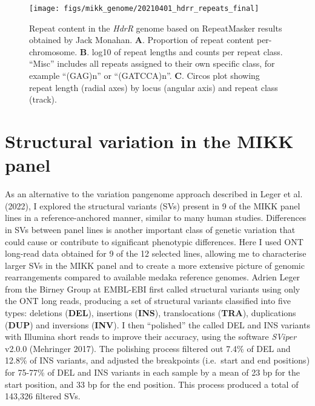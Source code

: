 \documentclass[
]{book}
\begin{document}
\begin{figure}
\texttt{[image: figs/mikk\_genome/20210401\_hdrr\_repeats\_final]} \caption{Repeat content in the \emph{HdrR} genome based on RepeatMasker results obtained by Jack Monahan. \textbf{A}. Proportion of repeat content per-chromosome. \textbf{B}. log10 of repeat lengths and counts per repeat class. ``Misc'' includes all repeats assigned to their own specific class, for example ``(GAG)n'' or ``(GATCCA)n''. \textbf{C}. Circos plot showing repeat length (radial axes) by locus (angular axis) and repeat class (track).}\label{fig:repeats}
\end{figure}

\hypertarget{mikksv-sec}{%
\section{Structural variation in the MIKK panel}\label{mikksv-sec}}

As an alternative to the variation pangenome approach described in Leger et al. (2022), I explored the structural variants (SVs) present in 9 of the MIKK panel lines in a reference-anchored manner, similar to many human studies. Differences in SVs between panel lines is another important class of genetic variation that could cause or contribute to significant phenotypic differences. Here I used ONT long-read data obtained for 9 of the 12 selected lines, allowing me to characterise larger SVs in the MIKK panel and to create a more extensive picture of genomic rearrangements compared to available medaka reference genomes. Adrien Leger from the Birney Group at EMBL-EBI first called structural variants using only the ONT long reads, producing a set of structural variants classified into five types: deletions (\textbf{DEL}), insertions (\textbf{INS}), translocations (\textbf{TRA}), duplications (\textbf{DUP}) and inversions (\textbf{INV}). I then ``polished'' the called DEL and INS variants with Illumina short reads to improve their accuracy, using the software \emph{SViper} v2.0.0 (Mehringer 2017). The polishing process filtered out 7.4\% of DEL and 12.8\% of INS variants, and adjusted the breakpoints (i.e.~start and end positions) for 75-77\% of DEL and INS variants in each sample by a mean of 23 bp for the start position, and 33 bp for the end position. This process produced a total of 143,326 filtered SVs.
\end{document}
